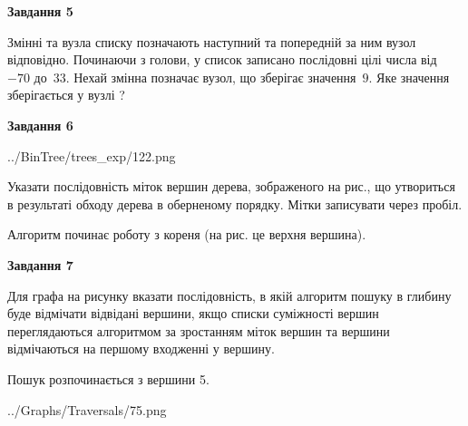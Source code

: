 \documentclass[12pt, ukrainian]{article}
\begin{document}
{\begin {large}
{\begin {center}\textbf{Завдання 5}\end {center}}\par
Змінні  та  вузла списку позначають наступний та попередній за ним вузол відповідно. Починаючи з голови, у список записано послідовні цілі числа від~$-70$ до~$33$. Нехай змінна  позначає вузол, що зберігає значення~$9$.
Яке значення зберігається у вузлі  ?\par
\newpage

{\begin {center}\textbf{Завдання 6}\end {center}}\par

\begin{center}
	{../BinTree/trees_exp/122.png}
\end{center}
Указати послідовність міток вершин дерева, зображеного на рис., що утвориться в результаті обходу дерева в оберненому порядку. Мітки записувати через пробіл.\par Алгоритм починає роботу з кореня (на рис. це верхня вершина).\par
\newpage

{\begin {center}\textbf{Завдання 7}\end {center}}\par
Для графа на рисунку вказати послідовність, в якій алгоритм пошуку в глибину буде відмічати відвідані вершини, якщо списки суміжності вершин переглядаються алгоритмом за зростанням міток вершин та вершини відмічаються на першому вход\-женні у вершину.\par
Пошук розпочинається з вершини 5.\par

\begin{center}
	{../Graphs/Traversals/75.png}
\end{center}\par
\newpage


\end{large}}
\end{document}
